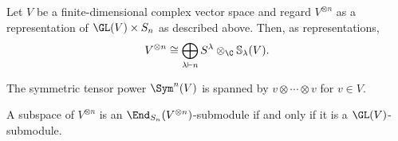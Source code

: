 \documentclass[../main.tex]{subfiles}
\begin{document}
\begin{theorem}
    Let $ V $ be a finite-dimensional complex vector space and regard $ V^{\otimes n} $ as a representation of $ \GL(V)\times S_{n} $ as described above. Then, as representations,
    \[
        V^{\otimes n} \cong \bigoplus_{\lambda\vdash n}S^{\lambda} \otimes_{\C} \mathbb{S}_{\lambda}(V).
    \]
\end{theorem}


\begin{lemma}\label{lem:symspan}
    The symmetric tensor power $ \Sym^{n}(V) $ is spanned by $ v \otimes \cdots \otimes v $ for $ v\in V $.
\end{lemma}



\begin{lemma}
    A subspace of $ V^{\otimes n} $ is an $ \End_{S_{n}}(V^{\otimes n}) $-submodule if and only if it is a $ \GL(V) $-submodule.
\end{lemma}
\end{document}

